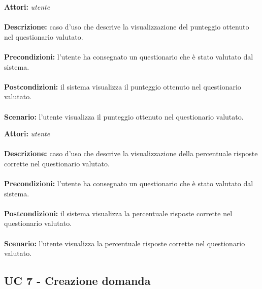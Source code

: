 \documentclass[a4paper,11pt]{article}
\begin{document}

\textbf{Attori:} \textit{utente}
\\ \\
\textbf{Descrizione:} caso d'uso che descrive la visualizzazione del punteggio ottenuto nel questionario valutato.\\
\\
\textbf{Precondizioni:} l'utente ha consegnato un questionario che è stato valutato dal sistema.\\
\\
\textbf{Postcondizioni:} il sistema visualizza il punteggio ottenuto nel questionario valutato.\\
\\
\textbf{Scenario:} l’utente visualizza il punteggio ottenuto nel questionario valutato.\\



\textbf{Attori:} \textit{utente}
\\ \\
\textbf{Descrizione:} caso d'uso che descrive la visualizzazione della percentuale risposte corrette nel questionario valutato.\\
\\
\textbf{Precondizioni:} l'utente ha consegnato un questionario che è stato valutato dal sistema.\\
\\
\textbf{Postcondizioni:} il sistema visualizza la percentuale risposte corrette nel questionario valutato.\\
\\
\textbf{Scenario:} l’utente visualizza la percentuale risposte corrette nel questionario valutato.\\


\newpage
\subsection{UC 7 - Creazione domanda}
\end{document}
